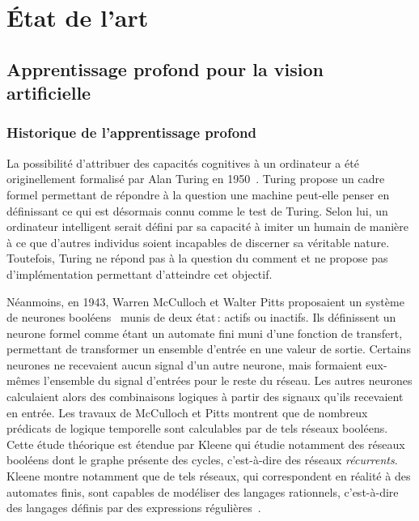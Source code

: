 \chapter{État de l'art}
\label{chap:etat}

\section{Apprentissage profond pour la vision artificielle}

\subsection{Historique de l'apprentissage profond}

La possibilité d'attribuer des capacités cognitives à un ordinateur a été originellement formalisé par Alan Turing en 1950~\cite{turing_computing_1950}. Turing propose un cadre formel permettant de répondre à la question \og{} une machine peut-elle penser \fg{} en définissant ce qui est désormais connu comme le test de Turing. Selon lui, un ordinateur intelligent serait défini par sa capacité à imiter un humain de manière à ce que d'autres individus soient incapables de discerner sa véritable nature. Toutefois, Turing ne répond pas à la question du \og comment \fg{} et ne propose pas d'implémentation permettant d'atteindre cet objectif.

Néanmoins, en 1943, Warren McCulloch et Walter Pitts proposaient un système de neurones booléens~\cite{mcculloch_logical_1943} munis de deux état\,: actifs ou inactifs. Ils définissent un neurone formel comme étant un automate fini muni d'une fonction de transfert, permettant de transformer un ensemble d'entrée en une valeur de sortie. Certains neurones ne recevaient aucun signal d'un autre neurone, mais formaient eux-mêmes l'ensemble du signal d'entrées pour le reste du réseau. Les autres neurones calculaient alors des combinaisons logiques à partir des signaux qu'ils recevaient en entrée. Les travaux de McCulloch et Pitts montrent que de nombreux prédicats de logique temporelle sont calculables par de tels réseaux booléens. Cette étude théorique est étendue par Kleene qui étudie notamment des réseaux booléens dont le graphe présente des cycles, c'est-à-dire des réseaux \emph{récurrents}. Kleene montre notamment que de tels réseaux, qui correspondent en réalité à des automates finis, sont capables de modéliser des langages rationnels, c'est-à-dire des langages définis par des expressions régulières~\cite{kleene_representation_1956}.

